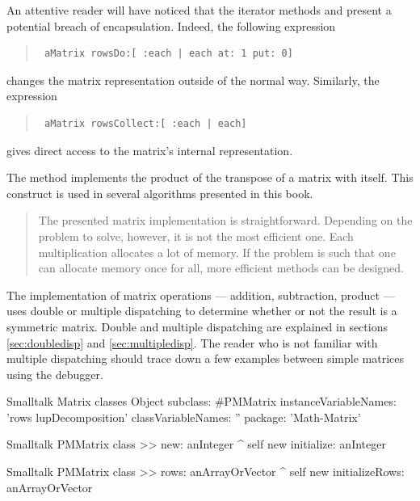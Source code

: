 An attentive reader will have noticed that the iterator methods
 and  present a potential breach of
encapsulation. Indeed, the following expression
\begin{quote}
\begin{verbatim}
 aMatrix rowsDo:[ :each | each at: 1 put: 0]
\end{verbatim}
\end{quote}
changes the matrix representation outside of the normal way.
Similarly, the expression
\begin{quote}
\begin{verbatim}
 aMatrix rowsCollect:[ :each | each]
\end{verbatim}
\end{quote}
gives direct access to the matrix's internal representation.

The method  implements the product of the transpose of
a matrix with itself. This construct is used in several algorithms
presented in this book.

\begin{quotation}
 The presented matrix implementation is
straightforward.
Depending on the problem to solve, however, it is not the most efficient one. Each multiplication allocates a lot of
memory.
If the problem is such that one can allocate memory once for all, more efficient methods can be designed.
\end{quotation}

The implementation of matrix operations --- addition, subtraction,
product --- uses double or multiple dispatching to determine
whether or not the result is a symmetric matrix.
Double and multiple dispatching are explained in sections \ref{sec:doubledisp} and \ref{sec:multipledisp}.
The reader who is not familiar with multiple dispatching should trace down a few examples between simple matrices using the debugger.

\begin{listing}[label=lst:matrix]{Smalltalk}
{Matrix classes}
Object subclass: #PMMatrix
   instanceVariableNames: 'rows lupDecomposition'
   classVariableNames: ''
   package: 'Math-Matrix'
\end{listing}

\begin{displaycode}{Smalltalk}
PMMatrix class >> new: anInteger
    ^ self new initialize: anInteger
\end{displaycode}

\begin{displaycode}{Smalltalk}
PMMatrix class >> rows: anArrayOrVector
    ^ self new initializeRows: anArrayOrVector
\end{displaycode}

